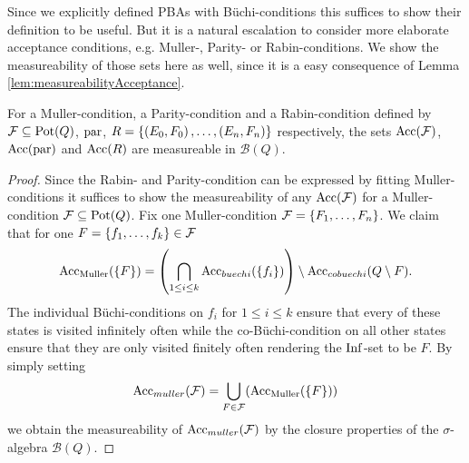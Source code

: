 Since we explicitly defined \acp{PBA} with Büchi-conditions this suffices to
show their definition to be useful. But it is a natural escalation to consider
more elaborate acceptance conditions, e.g. Muller-, Parity- or 
Rabin-conditions. We show the measureability of those sets here as well, since
it is a easy consequence of Lemma \ref{lem:measureabilityAcceptance}.
\begin{corollary}
  For a Muller-condition, a Parity-condition and a Rabin-condition
  defined by $\mathcal{F}\subseteq\operatorname{Pot}(Q)$, $\operatorname{par}$, 
  $R = \left\{\left(E_{0}, F_{0}\right),\dots,\left(E_{n}, F_{n}\right)\right\}$ respectively, the 
  sets $\operatorname{Acc}(\mathcal{F})$, $\operatorname{Acc}(\operatorname{par})$ and $\operatorname{Acc}(R)$ are measureable in 
  $\mathcal{B}(Q)$.
\end{corollary}
\begin{proof}
  Since the Rabin- and Parity-condition can be expressed by fitting 
  Muller-conditions it suffices to show the measureability of any 
  $\operatorname{Acc}(\mathcal{F})$ for a Muller-condition $\mathcal{F}\subseteq\operatorname{Pot}(Q)$.
  Fix one Muller-condition $\mathcal{F} = \left\{F_{1},\dots,F_{n}\right\}$. We claim
  that for one $F = \left\{f_{1},\dots, f_{k}\right\}\in\mathcal{F}$
  \begin{equation*}
    \operatorname{Acc}_{\operatorname{Muller}}(\left\{F\right\}) = \left(
      \bigcap\limits_{1\leq i\leq k}\operatorname{Acc}_{buechi}(\left\{f_{i}\right\})\right)\setminus
      \operatorname{Acc}_{cobuechi}(Q\setminus F).
  \end{equation*}
  The individual Büchi-conditions on $f_{i}$ for $1\leq i\leq k$ ensure that 
  every of these states is visited infinitely often while the 
  co-Büchi-condition on all other states ensure that they are only visited
  finitely often rendering the $\operatorname{Inf}$-set to be $F$. By simply setting
  \begin{equation*}
    \operatorname{Acc}_{muller}(\mathcal{F}) = \bigcup\limits_{F\in\mathcal{F}}(
    \operatorname{Acc}_{\operatorname{Muller}}(\left\{F\right\}))
  \end{equation*}
  we obtain the measureability of $\operatorname{Acc}_{muller}(\mathcal{F})$ by the closure
  properties of the $\sigma$-algebra $\mathcal{B}(Q)$.
\end{proof}

